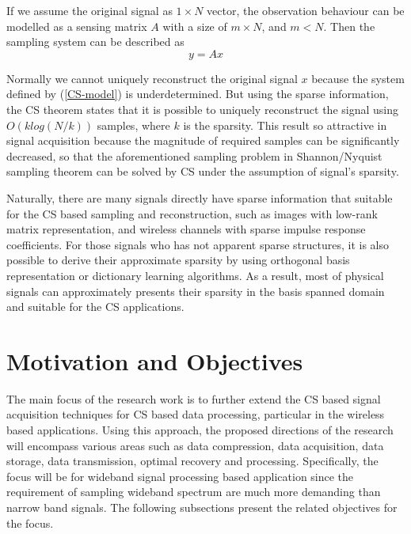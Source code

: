 If we assume the original signal as $1 \times N$ vector, the observation behaviour can be modelled as a sensing matrix $A$ with a size of $m \times N$, and $m < N$. Then the sampling system can be described as
\begin{equation}\label{CS-model}
y = Ax
\end{equation}

Normally we cannot uniquely reconstruct the original signal $x$ because the system defined by (\ref{CS-model}) is underdetermined. But using the sparse information, the CS theorem \cite{candes2006robust} states that it is possible to uniquely reconstruct the signal using $O(k log (N/k))$ samples, where $k$ is the sparsity. This result so attractive in signal acquisition because the magnitude of required samples can be significantly decreased, so that the aforementioned sampling problem in Shannon/Nyquist sampling theorem can be solved by CS under the assumption of signal's sparsity.

Naturally, there are many signals directly have sparse information that suitable for the CS based sampling and reconstruction, such as images with low-rank matrix representation, and wireless channels with sparse impulse response coefficients. For those signals who has not apparent sparse structures, it is also possible to derive their approximate sparsity by using orthogonal basis representation or dictionary learning algorithms. As a result, most of physical signals can approximately presents their sparsity in the basis spanned domain and suitable for the CS applications\cite{candes2006robust, candes2006near, rudelson2008sparse, rauhut2012restricted}.

\section{Motivation and Objectives}


The main focus of the research work is to further extend the CS based signal acquisition techniques for CS based data processing, particular in the wireless based applications. Using this approach, the proposed directions of the research will encompass various areas such as data compression, data acquisition, data storage, data transmission, optimal recovery and processing. Specifically, the focus will be for wideband signal processing based application since the requirement of sampling wideband spectrum are much more demanding than narrow band signals. The following subsections present the related objectives for the focus.

